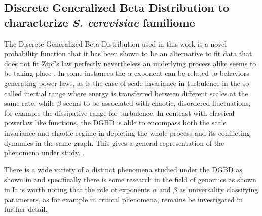 \documentclass[preprint,12pt]{elsarticle}
\begin{document}
\bigbreak

\subsection{Discrete Generalized Beta Distribution to characterize {\it S. cerevisiae} familiome}
The Discrete Generalized Beta Distribution used in this work is 
a novel probability function that it has been shown to be an
alternative to fit data that does not fit Zipf's law perfectly
nevertheless an underlying process alike seems to be taking 
place \cite{martinez2009universality, fontanelli2016beyondzipf}. 
In some instances the $\alpha$ exponent can be related 
to behaviors generating power laws, as is the case of scale 
invariance in turbulence in the so called 
inertial range where energy is transferred between different 
scales at the same rate, while $\beta$ seems to be associated 
with chaotic, disordered fluctuations, for example the 
dissipative range for turbulence. 
In contrast with classical powerlaw like functions, the DGBD is
able to encompass both the scale invariance and chaotic regime in
depicting the whole process and its conflicting dynamics in the 
same graph. This gives a general representation of the phenomena
under study. \cite{martinez2009universality}.\par
 
There is a wide variety of a distinct phenomena studied under 
the DGBD as shown in \cite{martinez2009universality} and specifically
there is some research in the field of genomics as shown in 
\cite{gupta2021modeling, fontanelli2016beyondzipf, li2016size}
It is worth noting that the role of exponents $\alpha$ and $\beta$
as universality classifying parameters, as for example in critical 
phenomena, remains be investigated in further detail.\par 

\end{document}

